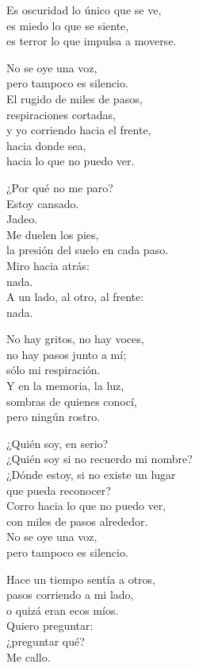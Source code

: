 \begin{lyrics}
Es oscuridad lo único que se ve,\\
es miedo lo que se siente,\\
es terror lo que impulsa a moverse.

No se oye una voz,\\
pero tampoco es silencio.\\
El rugido de miles de pasos,\\
respiraciones cortadas,\\
y yo corriendo hacia el frente,\\
hacia donde sea,\\
hacia lo que no puedo ver.

¿Por qué no me paro?\\
Estoy cansado.\\
Jadeo.\\
Me duelen los pies,\\
la presión del suelo en cada paso.\\
Miro hacia atrás:\\
nada.\\
A un lado, al otro, al frente:\\
nada.

No hay gritos, no hay voces,\\
no hay pasos junto a mí;\\
sólo mi respiración.\\
Y en la memoria, la luz,\\
sombras de quienes conocí,\\
pero ningún rostro.

¿Quién soy, en serio?\\
¿Quién soy si no recuerdo mi nombre?\\
¿Dónde estoy, si no existe un lugar\\
que pueda reconocer?\\
Corro hacia lo que no puedo ver,\\
con miles de pasos alrededor.\\
No se oye una voz,\\
pero tampoco es silencio.

Hace un tiempo sentía a otros,\\
pasos corriendo a mi lado,\\
o quizá eran ecos míos.\\
Quiero preguntar:\\
¿preguntar qué?\\
Me callo.


\end{lyrics}
